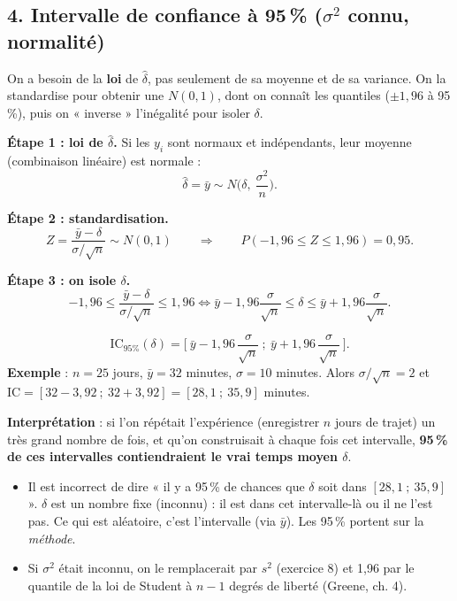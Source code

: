 \documentclass[11pt,a4paper]{article}
\begin{document}
\subsection*{4. Intervalle de confiance à 95\,\% ($\sigma^2$ connu, normalité)}

\begin{idee}
On a besoin de la \textbf{loi} de $\hat\delta$, pas seulement de sa moyenne et de sa variance. On la standardise pour obtenir une $N(0,1)$, dont on connaît les quantiles ($\pm1{,}96$ à 95\,\%), puis on « inverse » l'inégalité pour isoler $\delta$.
\end{idee}

\textbf{Étape 1 : loi de $\hat\delta$.} Si les $y_i$ sont normaux et indépendants, leur moyenne (combinaison linéaire) est normale :
\[
\hat\delta=\bar y\sim N\Big(\delta,\ \frac{\sigma^2}{n}\Big).
\]

\textbf{Étape 2 : standardisation.}
\[
Z=\frac{\bar y-\delta}{\sigma/\sqrt n}\sim N(0,1)\qquad\Longrightarrow\qquad P(-1{,}96\le Z\le1{,}96)=0{,}95 .
\]

\textbf{Étape 3 : on isole $\delta$.}
\[
-1{,}96\le\frac{\bar y-\delta}{\sigma/\sqrt n}\le1{,}96
\iff \bar y-1{,}96\frac{\sigma}{\sqrt n}\le\delta\le\bar y+1{,}96\frac{\sigma}{\sqrt n}.
\]

\begin{reponse}
\[
\text{IC}_{95\%}(\delta)=\Big[\ \bar y-1{,}96\,\frac{\sigma}{\sqrt n}\ ;\ \bar y+1{,}96\,\frac{\sigma}{\sqrt n}\ \Big].
\]
\textbf{Exemple} : $n=25$ jours, $\bar y=32$ minutes, $\sigma=10$ minutes. Alors $\sigma/\sqrt n=2$ et $\text{IC}=[32-3{,}92\ ;\ 32+3{,}92]=[28{,}1\ ;\ 35{,}9]$ minutes.

\textbf{Interprétation} : si l'on répétait l'expérience (enregistrer $n$ jours de trajet) un très grand nombre de fois, et qu'on construisait à chaque fois cet intervalle, \textbf{95\,\% de ces intervalles contiendraient le vrai temps moyen $\delta$}.
\end{reponse}

\begin{attention}
\begin{itemize}[nosep]
\item Il est incorrect de dire « il y a 95\,\% de chances que $\delta$ soit dans $[28{,}1\ ;\ 35{,}9]$ ». $\delta$ est un nombre fixe (inconnu) : il est dans cet intervalle-là ou il ne l'est pas. Ce qui est aléatoire, c'est l'intervalle (via $\bar y$). Les 95\,\% portent sur la \emph{méthode}.
\item Si $\sigma^2$ était inconnu, on le remplacerait par $s^2$ (exercice 8) et 1,96 par le quantile de la loi de Student à $n-1$ degrés de liberté (Greene, ch. 4).
\end{itemize}
\end{attention}
\end{document}
